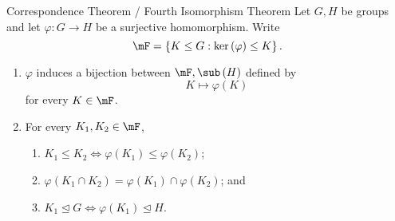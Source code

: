 \documentclass[pmath347]{subfiles}
\begin{document}
    \begin{theorem}{Correspondence Theorem / Fourth Isomorphism Theorem}
        Let $G,H$ be groups and let $\varphi:G\to H$ be a surjective homomorphism. Write
        \begin{equation*}
            \mF = \left\lbrace K\leq G: \ker\left( \varphi \right) \leq K \right\rbrace .
        \end{equation*}
        \begin{enumerate}
            \item $\varphi$ induces a bijection between $\mF, \sub\left( H \right)$ defined by
                \begin{equation*}
                    K\mapsto\varphi\left( K \right) 
                \end{equation*}
                for every $K\in\mF$.
            \item For every $K_1,K_2\in\mF$,
                \begin{enumerate}
                    \item $K_1\leq K_2\iff \varphi\left( K_1 \right) \leq\varphi\left( K_2 \right)$;
                    \item $\varphi\left( K_1\cap K_2 \right) = \varphi\left( K_1 \right) \cap\varphi\left( K_2 \right)$; and
                    \item $K_1\trianglelefteq G\iff\varphi\left( K_1 \right) \trianglelefteq H$.
                \end{enumerate}
        \end{enumerate}
    \end{theorem}
\end{document}
